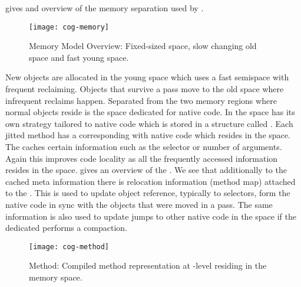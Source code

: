  gives and overview of the memory separation used by \Cog.
%
\begin{figure}[h]
	\centering
	\texttt{[image: cog-memory]}
	\caption[\Cog Memory Model Overview]{\Cog Memory Model Overview: Fixed-sized \JIT space, slow changing old space and fast young space.}
\end{figure}
%
New objects are allocated in the young space which uses a fast semispace \GC with frequent reclaiming.
Objects that survive a \GC pass move to the old space where infrequent reclaims happen.
Separated from the two memory regions where normal \PH objects reside is the \JIT space dedicated for native code.
In \Cog the \JIT space has its own \GC strategy tailored to native code which is stored in a structure called \CogMethod.
Each jitted \PH method has a corresponding \CogMethod with native code which resides in the \JIT space.
The \CogMethod caches certain information such as the selector or number of arguments.
Again this improves code locality as all the frequently accessed information resides in the \JIT space.
 gives an overview of the \CogMethod.
We see that additionally to the cached meta information there is relocation information (method map) attached to the \CogMethod.
This is used to update object reference, typically to selectors, form the native code in sync with the objects that were moved in a \GC pass.
The same information is also used to update jumps to other native code in the \JIT space if the dedicated \JIT \GC performs a compaction.
%
\begin{figure}[h]
	\centering
	\texttt{[image: cog-method]}
	\caption[\Cog Method]{\Cog Method: Compiled method representation at \JIT-level residing in the \JIT memory space.}
\end{figure}

